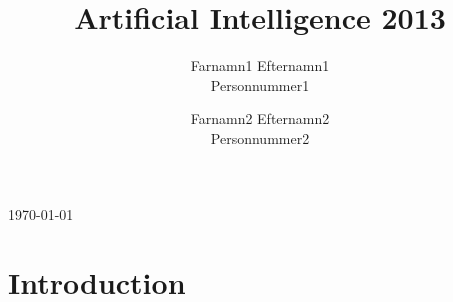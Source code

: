 \documentclass[a4paper,twocolumn]{article}
\begin{document}
\title{Artificial Intelligence 2013}
\author{Farnamn1 Efternamn1\\ Personnummer1 \and Farnamn2 Efternamn2\\
  Personnummer2}
\today

\maketitle

\newpage

\section{Introduction}
\label{sec:intro}
\end{document}
